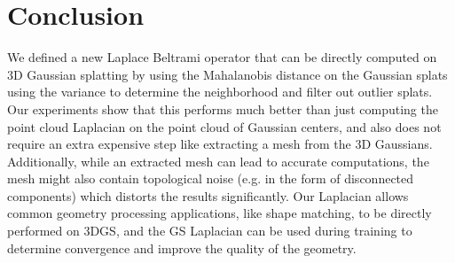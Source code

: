\section{Conclusion}
\label{sec:conclusion}

We defined a new Laplace Beltrami operator that can be directly computed on 3D Gaussian splatting by using the Mahalanobis distance on the Gaussian splats using the variance to determine the neighborhood and filter out outlier splats. 
Our experiments show that this performs much better than just computing the point cloud Laplacian on the point cloud of Gaussian centers, and also does not require an extra expensive step like extracting a mesh from the 3D Gaussians. 
Additionally, while an extracted mesh can lead to accurate computations, the mesh might also contain topological noise (e.g. in the form of disconnected components) which distorts the results significantly. 
Our Laplacian allows common geometry processing applications, like shape matching, to be directly performed on 3DGS, and the GS Laplacian can be used during training to determine convergence and improve the quality of the geometry. 
